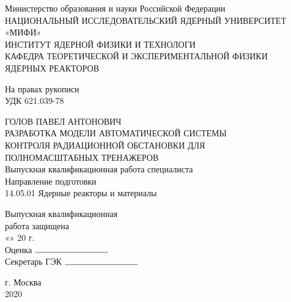 \begin{titlepage}
	\begin{center}
		\small 
		Министерство образования и науки Российской Федерации\\
		НАЦИОНАЛЬНЫЙ ИССЛЕДОВАТЕЛЬСКИЙ ЯДЕРНЫЙ УНИВЕРСИТЕТ «МИФИ»\\[0.6cm]

		ИНСТИТУТ ЯДЕРНОЙ ФИЗИКИ И ТЕХНОЛОГИ\\[0.7cm]
		КАФЕДРА ТЕОРЕТИЧЕСКОЙ И ЭКСПЕРИМЕНТАЛЬНОЙ ФИЗИКИ \\ЯДЕРНЫХ РЕАКТОРОВ\\[1.6cm]

		\setlength{\leftskip}{13cm}

		На правах рукописи\\
		УДК 621.039-78\\[1.5cm]
	\end{center} 
	\begin{center}
		\small{ГОЛОВ ПАВЕЛ АНТОНОВИЧ}\\[0.6cm]
		
		РАЗРАБОТКА МОДЕЛИ АВТОМАТИЧЕСКОЙ СИСТЕМЫ \\ КОНТРОЛЯ РАДИАЦИОННОЙ ОБСТАНОВКИ ДЛЯ \\ПОЛНОМАСШТАБНЫХ ТРЕНАЖЕРОВ\\[1.5cm]

		\normalsize
		Выпускная квалификационная работа специалиста\\[1.3cm]

		\small
		Направление подготовки\\
		14.05.01 Ядерные реакторы и материалы\\[2.0cm]

		\setlength{\leftskip}{10cm}

		Выпускная квалификационная\\ работа защищена \\
		«\hspace{0.5cm}» \hspace{2cm} 20 \hspace{0.5cm} г.\\
		Оценка $\rule{3cm}{0.15mm}$\\
		Секретарь ГЭК $\rule{3cm}{0.15mm}$\\[2.7cm]
	\end{center}
	\begin{center}
		\small
		г. Москва\\
		2020
	\end{center}
	\thispagestyle{empty}
\end{titlepage}
